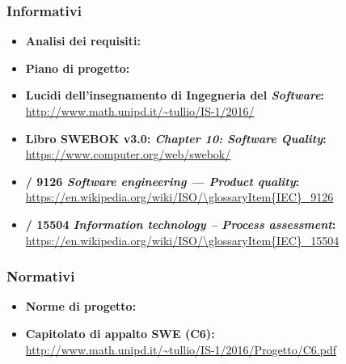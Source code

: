     \subsubsection{Informativi}
      \begin{itemize}
        \item \textbf{Analisi dei requisiti:} 
        \item \textbf{Piano di progetto:} 
        \item \textbf{Lucidi dell'insegnamento di Ingegneria del \emph{Software}:}\\
        \url{http://www.math.unipd.it/~tullio/IS-1/2016/}
        \item \textbf{Libro SWEBOK v3.0: \emph{Chapter 10: Software Quality}:}\\
        \url{https://www.computer.org/web/swebok/}
        \item \textbf{/ 9126 \emph{Software engineering — Product quality}:}\\
        \url{https://en.wikipedia.org/wiki/ISO/\glossaryItem{IEC}_9126}
        \item \textbf{/ 15504 \emph{Information technology – Process assessment}:}\\
        \url{https://en.wikipedia.org/wiki/ISO/\glossaryItem{IEC}_15504}
      \end{itemize}
    \subsubsection{Normativi}
      \begin{itemize}
        \item \textbf{Norme di progetto:} 
        \item \textbf{Capitolato di appalto SWE (C6):}\\
        \url{http://www.math.unipd.it/~tullio/IS-1/2016/Progetto/C6.pdf}
      \end{itemize}
